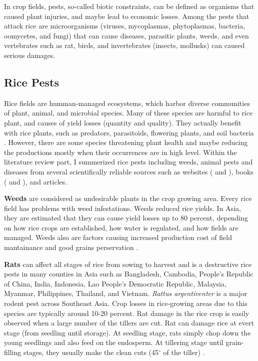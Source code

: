 \documentclass[12pt, oneside]{report}
\begin{document}
In crop fields, pests, so-called biotic constraints, can be defined as organisms that caused plant injuries, and maybe lead to economic losses. Among the pests that attack rice are microorganisms (viruses, mycoplasmas, phytoplasmas, bacteria, oomycetes, and fungi) that can cause diseases, parasitic plants, weeds, and even vertebrates such as rat, birds, and invertebrates (insects, mollusks) can caused serious damages. %
\subsection*{Rice Pests}

Rice fields are humman-managed ecosystems, which harbor diverse communities of plant, animal, and microbial species. Many of these species are harmful to rice plant, and causes of yield losses (quantity and quality). They actually benefit with rice plants, such as predators, parasitoids, flowering plants, and soil bacteria \citep{norton2010rice}. However, there are some species threatening plant health and maybe reducing the productions mostly when their occurrences are in high level. Within the literature review part, I summerized rice pests including weeds, animal pests and diseases from several scientifically reliable sources such as websites (\citet{irrirkb} and ), books (\citet{ouricedisease} and \citet{mew2002handbook}), and articles.

\textbf{Weeds} are considered as undesirable plants in the crop growing area. Every rice field has problems with weed infestations. Weeds reduced rice yields. In Asia, they are estimated that they can cause yield losses up to 80 percent, depending on how rice crops are established, how water is regulated, and how fields are managed. Weeds also are factors causing increased production cost of field mantainance and good grains perservation \citep{litsinger1991crop}.

\textbf{Rats} can affect all stages of rice from sowing to harvest and is a destructive rice pests in many counties in Asia such as Bangladesh, Cambodia, People's Republic of China, India, Indonesia, Lao People's Democratic Republic, Malaysia, Myanmar, Philippines, Thailand, and Vietnam. \textit{Rattus argentiventer} is a major rodent pest across Southeast Asia. Crop losses in rice-growing areas due to this species are typically around 10-20 percent. Rat damage in the rice crop is easily observed when a large number of the tillers are cut. Rat can damage rice at evert stage (from seedling until storage). At seedling stage, rats simply chop down the young seedlings and also feed on the endosperm. At tillering stage until grain-filling stages, they usually make the clean cuts (45$^{\circ}$ of the tiller) \citep{}. 
\end{document}
